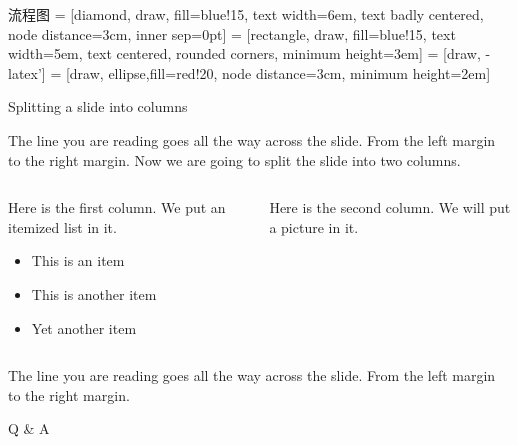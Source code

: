 \documentclass[xcolor=svgnames]{beamer}
\begin{document}
\begin{frame}{流程图}
 = [diamond, draw, fill=blue!15, 
    text width=6em, text badly centered, node distance=3cm, inner sep=0pt]
 = [rectangle, draw, fill=blue!15, 
    text width=5em, text centered, rounded corners, minimum height=3em]
 = [draw, -latex']
 = [draw, ellipse,fill=red!20, node distance=3cm,
    minimum height=2em]
    
\end{frame}

\begin{frame}{Splitting a slide into columns}

The line you are reading goes all the way across the slide.
From the left margin to the right margin.  Now we are going
to split the slide into two columns.
\bigskip

\begin{columns}
  \begin{column}{0.5\textwidth}
    Here is the first column.  We put an itemized list in it.
    \begin{itemize}
      \item This is an item
      \item This is another item
      \item Yet another item
    \end{itemize}
  \end{column}

  \begin{column}{0.3\textwidth}
    Here is the second column.  We will put a picture in it.
   
  \end{column}
\end{columns}
\bigskip
The line you are reading goes all the way across the slide.
From the left margin to the right margin.
\end{frame}
\begin{frame}[c]{} %
    \begin{center}\Huge
        Q \& A
    \end{center}
\end{frame} 
\end{document}
